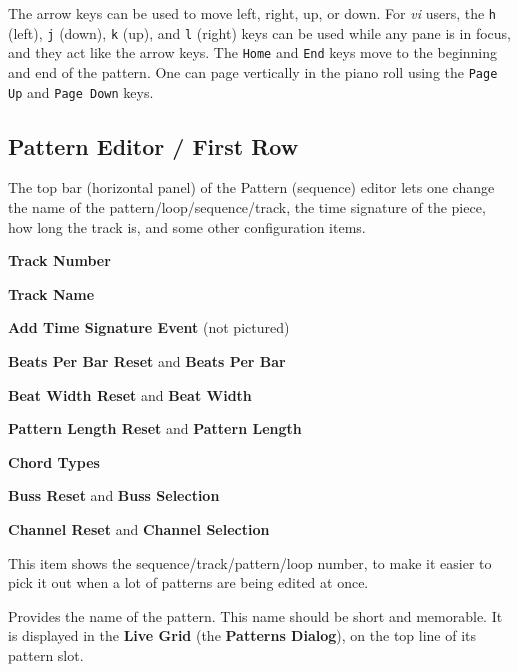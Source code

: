    The arrow keys can be used to move left, right, up, or down.
   For \textsl{vi} users, the \texttt{h} (left), \texttt{j} (down),
   \texttt{k} (up), and \texttt{l} (right)
   keys can be used while any pane is in focus, and they act like the arrow
   keys.
   The \texttt{Home} and \texttt{End} keys move to the beginning and end of the
   pattern.
   One can page vertically in the piano roll using the
    \texttt{Page Up} and 
    \texttt{Page Down} keys.

\subsection{Pattern Editor / First Row}
\label{subsec:pattern_editor_first_row}

   The top bar (horizontal panel) of the Pattern (sequence) editor
   lets one change the name of
   the pattern/loop/sequence/track, the time signature of the piece, how long
   the track is, and some other configuration items.

   \begin{enumber}
      \item \textbf{Track Number}
      \item \textbf{Track Name}
      \item \textbf{Add Time Signature Event} (not pictured)
      \item \textbf{Beats Per Bar Reset} and \textbf{Beats Per Bar}
      \item \textbf{Beat Width Reset} and \textbf{Beat Width}
      \item \textbf{Pattern Length Reset} and \textbf{Pattern Length}
      \item \textbf{Chord Types}
      \item \textbf{Buss Reset} and \textbf{Buss Selection}
      \item \textbf{Channel Reset} and \textbf{Channel Selection}
   \end{enumber}

   \setcounter{ItemCounter}{0}      %

   This item shows the sequence/track/pattern/loop
   number, to make it easier to pick it out when a lot of patterns are being
   edited at once.

   Provides the name of the pattern.
   This name should be short and memorable.
   It is displayed in the \textbf{Live Grid} (the \textbf{Patterns Dialog}),
   on the top line of its pattern slot.

